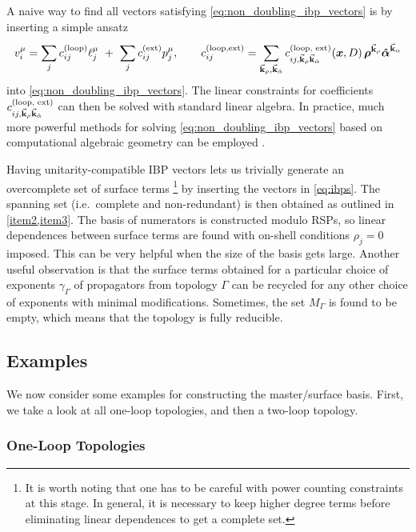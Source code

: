 {
  \def\coeff{c^{(\text{loop, ext})}_{ij,\va{k}_\rho \va{k}_{\hat{\alpha}}}}
  A naive way to find all vectors satisfying \cref{eq:non_doubling_ibp_vectors}
  is by inserting a simple ansatz
  \begin{equation} \label{eq:unitarity_compaible_ibp_ansatz}
    v_i^\mu = \sum_{j}^{}c^{(\text{loop})}_{ij}\ell^\mu_j ~+~  \sum_{j}^{}c^{(\text{ext})}_{ij} p^\mu_j, \qquad
    c_{ij}^{(\text{loop,ext})} = \sum_{\va{k}_\rho, \va{k}_{\hat{\alpha}}} \coeff (\vb*{x},D)\, \vb*{\rho}^{\va{k}_\rho}\vb*{\hat{\alpha}}^{\va{k}_\alpha}
  \end{equation}
  into \cref{eq:non_doubling_ibp_vectors}.
  The linear constraints for coefficients $\coeff$ can then be solved with standard linear algebra.
}%
In practice, much more powerful methods for solving \cref{eq:non_doubling_ibp_vectors}  based on computational
algebraic geometry can be employed \cite{Larsen:2015ped,Boehm:2018fpv,Zhang:2016kfo,Abreu:2017xsl,Bendle2019}.

Having unitarity-compatible IBP vectors lets us trivially generate an overcomplete set of surface terms%
\footnote{
  It is worth noting that one has to be careful with power counting constraints at this stage.
  In general, it is necessary to keep higher degree terms before eliminating linear dependences to get a complete set.
}
by inserting the vectors in \cref{eq:ibps}.
The spanning set (i.e.\ complete and non-redundant) is then obtained as outlined in \cref{item2,item3}.
The basis of numerators is constructed modulo RSPs, so
linear dependences between surface terms are found with on-shell conditions $\rho_j=0$ imposed.
This can be very helpful when the size of the basis gets large.
Another useful observation is that the surface terms obtained for a particular choice of exponents $\gamma_\Gamma$
of propagators from topology $\Gamma$ 
can be recycled for any other choice of exponents with minimal modifications.
Sometimes, the set $M_\Gamma$ is found to be empty, which means that the topology is fully reducible.


\subsection{Examples}
\label{sec:ms_examples}

We now consider some examples for constructing the master/surface basis.
First, we take a look at all one-loop topologies, 
and then a two-loop topology.

\subsubsection{One-Loop Topologies}

